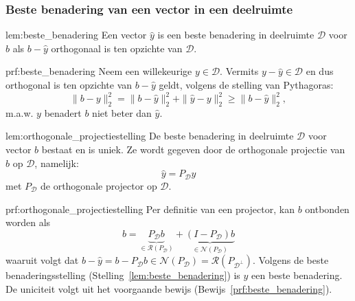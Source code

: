 \subsubsection{Beste benadering van een vector in een deelruimte}

\vspace{0.5cm}

\begin{lem}{lem:beste_benadering}
    \vspace{-0.1cm}
    Een vector $\hat{y}$ is een beste benadering in deelruimte $\mathcal{D}$ voor $b$ als $b - \hat{y}$ orthogonaal is ten opzichte van $\mathcal{D}$.
    \vspace{-0.1cm}
\end{lem}

\begin{prf}{prf:beste_benadering}
    \vspace{-0.1cm}
    Neem een willekeurige $y \in \mathcal{D}$. Vermits $y-\hat{y} \in \mathcal{D}$ en dus orthogonal is ten opzichte van $b - \hat{y}$ geldt, volgens de stelling van Pythagoras:
    \begin{equation*}
        \|b - y\|_2^2 = \| b - \hat{y}\|_2^2 + \| \hat{y} - y\|_2^2 \geq \| b - \hat{y}\|_2^2,
    \end{equation*}
    m\@.a\@.w\@. $y$ benadert $b$ niet beter dan $\hat{y}$.
    \vspace{-0.3cm}
\end{prf}

\begin{lem}{lem:orthogonale_projectiestelling}
    \vspace{-0.1cm}
    De beste benadering in deelruimte $\mathcal{D}$ voor vector $b$ bestaat en is uniek. Ze wordt gegeven door de orthogonale projectie van $b$ op $\mathcal{D}$, namelijk:
    \begin{equation*}
        \hat{y} = P_{\mathcal{D}}y
    \end{equation*}
    met $P_{\mathcal{D}}$ de orthogonale projector op $\mathcal{D}$.
    \vspace{-0.1cm}
\end{lem}

\begin{prf}{prf:orthogonale_projectiestelling}
    \vspace{-0.1cm}
    Per definitie van een projector, kan $b$ ontbonden worden als
    \begin{equation*}
        b = \underbrace{P_{\mathcal{D}}b}_{\in \mathcal{R}(P_{\mathcal{D}})} + \underbrace{(I - P_{\mathcal{D}})b}_{\in \mathcal{N}(P_{\mathcal{D}})}
    \end{equation*}
    waaruit volgt dat $b - \hat{y} = b - P_{\mathcal{D}}b \in \mathcal{N}(P_{\mathcal{D}}) = \mathcal{R}(P_{\mathcal{D}^\perp})$. Volgens de beste benaderingsstelling (Stelling~\ref{lem:beste_benadering}) is $\hat{y}$ een beste benadering. De uniciteit volgt uit het voorgaande bewijs (Bewijs~\ref{prf:beste_benadering}).
    \vspace{-0.1cm}
\end{prf}

